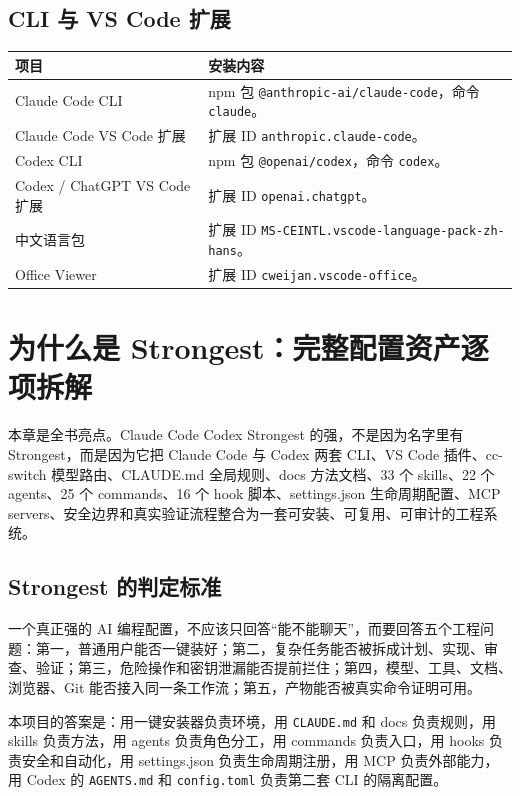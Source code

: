 \documentclass[11pt,a4paper]{ctexbook}
\begin{document}
\section{CLI 与 VS Code 扩展}

\begin{longtable}{p{}p{}}
\toprule
项目 & 安装内容 \\
\midrule
Claude Code CLI & npm 包 \texttt{@anthropic-ai/claude-code}，命令 \texttt{claude}。 \\
Claude Code VS Code 扩展 & 扩展 ID \texttt{anthropic.claude-code}。 \\
Codex CLI & npm 包 \texttt{@openai/codex}，命令 \texttt{codex}。 \\
Codex / ChatGPT VS Code 扩展 & 扩展 ID \texttt{openai.chatgpt}。 \\
中文语言包 & 扩展 ID \texttt{MS-CEINTL.vscode-language-pack-zh-hans}。 \\
Office Viewer & 扩展 ID \texttt{cweijan.vscode-office}。 \\
\bottomrule
\end{longtable}



\chapter{为什么是 Strongest：完整配置资产逐项拆解}

\begin{infobox}
本章是全书亮点。Claude Code Codex Strongest 的强，不是因为名字里有 Strongest，而是因为它把 Claude Code 与 Codex 两套 CLI、VS Code 插件、cc-switch 模型路由、CLAUDE.md 全局规则、docs 方法文档、33 个 skills、22 个 agents、25 个 commands、16 个 hook 脚本、settings.json 生命周期配置、MCP servers、安全边界和真实验证流程整合为一套可安装、可复用、可审计的工程系统。
\end{infobox}

\section{Strongest 的判定标准}

一个真正强的 AI 编程配置，不应该只回答“能不能聊天”，而要回答五个工程问题：第一，普通用户能否一键装好；第二，复杂任务能否被拆成计划、实现、审查、验证；第三，危险操作和密钥泄漏能否提前拦住；第四，模型、工具、文档、浏览器、Git 能否接入同一条工作流；第五，产物能否被真实命令证明可用。

本项目的答案是：用一键安装器负责环境，用 \texttt{CLAUDE.md} 和 docs 负责规则，用 skills 负责方法，用 agents 负责角色分工，用 commands 负责入口，用 hooks 负责安全和自动化，用 settings.json 负责生命周期注册，用 MCP 负责外部能力，用 Codex 的 \texttt{AGENTS.md} 和 \texttt{config.toml} 负责第二套 CLI 的隔离配置。
\end{document}
